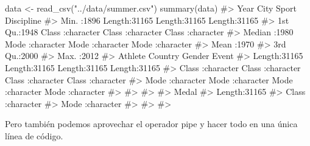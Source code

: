 \documentclass[
  letterpaper,
  DIV=11,
  numbers=noendperiod,
  oneside]{scrreprt}
\newenvironment{Shaded}{\begin{snugshade}}{\end{snugshade}}
\newcommand{\CommentTok}[1]{\textcolor[rgb]{0.37,0.37,0.37}{#1}}
\newcommand{\FunctionTok}[1]{\textcolor[rgb]{0.28,0.35,0.67}{#1}}
\newcommand{\NormalTok}[1]{\textcolor[rgb]{0.00,0.23,0.31}{#1}}
\newcommand{\OtherTok}[1]{\textcolor[rgb]{0.00,0.23,0.31}{#1}}
\newcommand{\StringTok}[1]{\textcolor[rgb]{0.13,0.47,0.30}{#1}}
\begin{document}
\begin{Shaded}
\begin{Highlighting}[]
\NormalTok{data }\OtherTok{\textless{}{-}} \FunctionTok{read\_csv}\NormalTok{(}\StringTok{"../data/summer.csv"}\NormalTok{)}
\FunctionTok{summary}\NormalTok{(data)}
\CommentTok{\#\textgreater{}       Year          City              Sport            Discipline       }
\CommentTok{\#\textgreater{}  Min.   :1896   Length:31165       Length:31165       Length:31165      }
\CommentTok{\#\textgreater{}  1st Qu.:1948   Class :character   Class :character   Class :character  }
\CommentTok{\#\textgreater{}  Median :1980   Mode  :character   Mode  :character   Mode  :character  }
\CommentTok{\#\textgreater{}  Mean   :1970                                                           }
\CommentTok{\#\textgreater{}  3rd Qu.:2000                                                           }
\CommentTok{\#\textgreater{}  Max.   :2012                                                           }
\CommentTok{\#\textgreater{}    Athlete            Country             Gender             Event          }
\CommentTok{\#\textgreater{}  Length:31165       Length:31165       Length:31165       Length:31165      }
\CommentTok{\#\textgreater{}  Class :character   Class :character   Class :character   Class :character  }
\CommentTok{\#\textgreater{}  Mode  :character   Mode  :character   Mode  :character   Mode  :character  }
\CommentTok{\#\textgreater{}                                                                             }
\CommentTok{\#\textgreater{}                                                                             }
\CommentTok{\#\textgreater{}                                                                             }
\CommentTok{\#\textgreater{}     Medal          }
\CommentTok{\#\textgreater{}  Length:31165      }
\CommentTok{\#\textgreater{}  Class :character  }
\CommentTok{\#\textgreater{}  Mode  :character  }
\CommentTok{\#\textgreater{}                    }
\CommentTok{\#\textgreater{}                    }
\CommentTok{\#\textgreater{} }
\end{Highlighting}
\end{Shaded}

Pero también podemos aprovechar el operador pipe y hacer todo en una
única línea de código.
\end{document}
